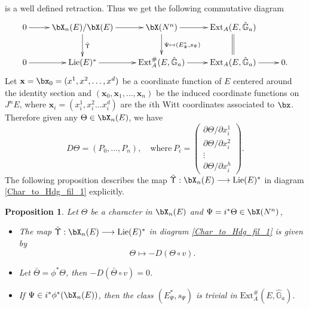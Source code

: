 \documentclass{amsart}
\newtheorem {proposition}[theorem] {\bf Proposition}
\numberwithin {equation}{section}
\begin{document}
is a well defined retraction.
Thus we get the following commutative diagram
\begin{equation}
\xymatrix{
		0 \ar[r] & {\bX}_{n}(E)/\bX(E) \ar[r] \ar[d]^{\tilde{\Upsilon}} & 
		{\bX}(N^{n}) \ar[r] \ar[d]^{\Psi\mapsto (E_{\Psi}^{*},s_{\Psi})}& 
		\mathrm{Ext}_{A}(E,\hat{\mathbb{G}}_{a})  \ar@{=}[d]& \\
		0 \ar[r] &\mathrm{Lie} (E)^{*} \ar[r] & \mathrm{Ext}^{\#}_{A}(E,\hat{\mathbb{G}}_{a}) \ar[r] & 
\mathrm{Ext}_{A}(E,\hat{\mathbb{G}}_{a}) \ar[r] & 0.
	}
\end{equation}\label{Char_to_Hdg_fil_1}
\noindent Let $\mathbf{x}=\bx_0 = (x^{1}, x^{2}, \dots, x^{d})$ be a coordinate function of $E$ centered around the identity section and $\left(\mathbf{x}_{0},\mathbf{x}_{1},\ldots, \mathbf{x}_{n}\right)$ be the induced
 coordinate functions on $J^{n}E$, where $\mathbf{x}_{i}=(x^{1}_{i}, x^{2}_{i} 
\dots x^{d}_{i})$ are the $i$th Witt coordinates associated to
$\bx$.
 Therefore given any $\Theta \in {\bX}_{n}(E)$, we have 
\begin{equation}
D\Theta=(P_{0},\ldots,P_{n}),\quad \mathrm{where}~
P_{i}=\begin{pmatrix}
           {\partial \Theta}/{\partial x^{1}_{i}} \\
           {\partial \Theta}/{\partial x^{2}_{i}} \\
           \vdots \\
          {\partial \Theta}/{\partial x^{h}_{i}}
           \end{pmatrix}.
\end{equation}\label{Derivative_matrix}
The following proposition describes the map $\tilde{\Upsilon}:{\bX}_{n}(E)\longrightarrow\mathrm{Lie}(E)^{*}$ in diagram \eqref{Char_to_Hdg_fil_1} explicitly.

\begin{proposition} Let $\Theta$ be a character in ${\bX}_{n}(E)$ and $\Psi=i^{*}\Theta \in {\bX}(N^{n})$,
\begin{itemize}
\item[(a)] The map $\tilde{\Upsilon}:{\bX}_{n}(E)\longrightarrow \mathrm{Lie}(E)^{*}$ in diagram \eqref{Char_to_Hdg_fil_1} is given by $$\Theta \mapsto -D(\Theta \circ v).$$
\item[(b)] Let $\bar{\Theta}=\phi^{*}\Theta $, then $-D(\bar{\Theta}\circ v)=0$.
\item[(c)]If $\Psi\in i^{*}\phi^{*}({\bX}_{n}(E))$, then the class $(E_{\Psi}^{*},s_{\Psi})$ is trivial in $\mathrm{Ext}^{\#}_{A}(E,\hat{\mathbb{G}}_{a})$.
\end{itemize}
\end{proposition}\label{diagram}
\end{document}
